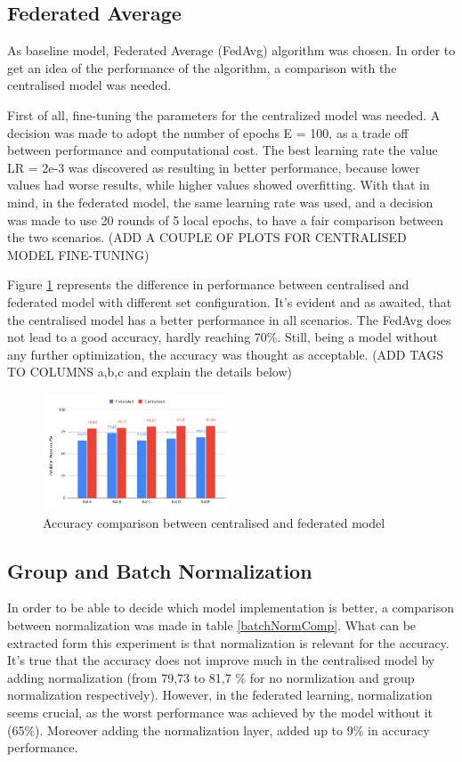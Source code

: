 \documentclass[twocolumn]{article}
\begin{document}
\subsection{Federated Average}
As baseline model, Federated Average (FedAvg) algorithm was chosen. In order to get an idea of the performance of the algorithm, a comparison with the centralised model was needed. 

First of all, fine-tuning the parameters for the centralized model was needed. A decision was made to adopt the number of epochs E = 100, as a trade off between performance and computational cost. The best learning rate the value LR = 2e-3 was discovered as resulting in better performance, because lower values had worse results, while higher values showed overfitting. With that in mind, in the federated model, the same learning rate was used, and a decision was made to use 20 rounds of 5 local epochs, to have a fair comparison between the two scenarios.
(ADD A COUPLE OF PLOTS FOR CENTRALISED MODEL FINE-TUNING)

Figure \ref{AccCompFedCent} represents the difference in performance between centralised and federated model with different set configuration. It's evident and as awaited, that the centralised model has a better performance in all scenarios. The FedAvg does not lead to a good accuracy, hardly reaching 70\%. Still, being a model without any further optimization, the accuracy was thought as acceptable. (ADD TAGS TO COLUMNS a,b,c and explain the details below)


\begin{figure}
    \centering
    \includegraphics[width=0.5\textwidth,height=.3\textheight]{FedAccuracyComp.png}
    \caption{Accuracy comparison between centralised and federated model}
     \label{AccCompFedCent} 
\end{figure}
\subsection{Group and Batch Normalization}
In order to be able to decide which model implementation is better, a comparison between normalization was made in table \ref{batchNormComp}. What can be extracted form this experiment is that normalization is relevant for the accuracy. It's true that the accuracy does not improve much in the centralised model by adding normalization (from 79,73 to 81,7 \% for no normlization and group normalization respectively). However, in the federated learning, normalization seems crucial, as the worst performance was achieved by the model without it (65\%). Moreover adding the normalization layer, added up to 9\% in accuracy performance. 
\end{document}
